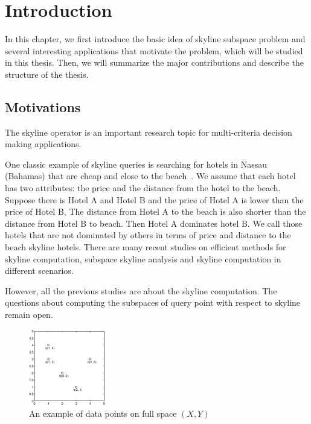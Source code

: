 
%
%

\chapter{Introduction}

In this chapter, we first introduce the basic idea of skyline subspace problem and several interesting applications that motivate the problem, which will be studied in this thesis. Then, we will summarize the major contributions and describe the structure of the thesis.

\section{Motivations}
The skyline operator is an important research topic for multi-criteria decision making applications.

One classic example of skyline queries is searching for hotels in Nassau (Bahamas) that are cheap and close to the beach~\cite{borzsony2001skyline}. We assume that each hotel has two attributes: the price and the distance from the hotel to the beach.
Suppose there is Hotel A and Hotel B and the price of Hotel A is lower than the price of Hotel B, The distance from Hotel A to the beach is also shorter than the distance from Hotel B to beach.
Then Hotel A dominates hotel B.
We call those hotels that are not dominated by others in terms of price and distance to the beach skyline hotels. 
There are many recent studies on efficient methods for skyline computation, subspace skyline analysis and skyline computation in different scenarios.

However, all the previous studies are about the skyline computation. The questions about computing the subspaces of query point with respect to skyline remain open.

\begin{figure}[H]
\centering
\includegraphics[width=0.3\textwidth]{figs/intro_xy.eps}
\caption{An example of data points on full space $(X, Y)$}
\label{fig:intro_xy}
\end{figure}


